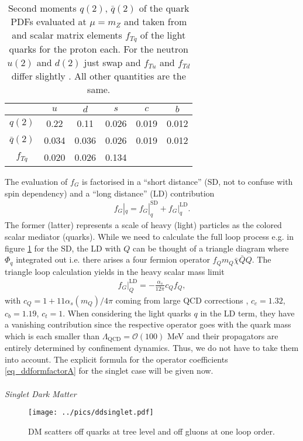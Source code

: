 \begin{table}[b]
 \begin{tabular}{c|ccccc}
   & $u$ & $d$ & $s$ & $c$ &$b$ \\
   \hline
  $q(2)$ & 0.22 & 0.11 & 0.026 & 0.019 & 0.012\\
  $\bar q(2)$ & 0.034 & 0.036 & 0.026 & 0.019 & 0.012\\
  $f_{Tq}$ & 0.020& 0.026 & 0.134 \cite{1209.3641}\\
 \end{tabular}
\caption{Second moments $q(2)$, $\bar q(2)$ of the quark PDFs evaluated at $\mu=m_Z$ and taken from \cite{0201195} and scalar matrix elements $f_{Tq}$ of 
the light quarks for the 
proton each. For the neutron $u(2)$ and $d(2)$ just swap and $f_{Tu}$ and $f_{Td}$ differ slightly \cite{9506380}. All other quantities are the same. }
\label{tab_parton}
\end{table}
\noindent The evaluation of $f_G$ is factorised in a ``short distance'' (SD, not to confuse with spin dependency) and a ``long distance'' (LD) 
contribution
\begin{align}
 f_G|_q = f_G|^\text{SD}_q + f_G|^\text{LD}_q. 
\end{align}
The former (latter) represents a scale of heavy (light) particles as the colored scalar mediator (quarks). While we need to calculate the full
loop process e.g. in figure \ref{pic_ddsinglet} for the SD, the LD with $Q$ can be thought of a triangle diagram where $\Phi_q$ integrated 
out i.e. there arises a four fermion operator $f_Q m_Q \bar \chi \bar Q Q$. The triangle loop calculation yields in the heavy scalar mass limit 
\begin{align}
 f_G|_Q^\text{LD} = -\frac{\alpha_s}{12\pi} c_Q f_Q,
 \label{eq_longdistance}
\end{align}
with $c_Q = 1+11\alpha_s(m_Q)/4\pi$ coming from large QCD corrections \cite{Djouadi}, $c_c=1.32$, $c_b = 1.19$, $c_t = 1$.
When considering the light quarks $q$ in the LD term, they have a vanishing contribution since the respective operator goes with the quark mass
which is each smaller than $\Lambda_\text{QCD} = \mathcal{O}(100)$ MeV and their propagators are entirely determined by confinement dynamics. Thus,
we do not have to take them into account. The explicit formula for the operator coefficients \eqref{eq_ddformfactorA} for the singlet case 
will be given now.
\\ \\ \textit{Singlet Dark Matter}\\
\begin{figure}[t]
 \texttt{[image: ../pics/ddsinglet.pdf]}
 \caption{DM scatters off quarks at tree level and off gluons at one loop order.}
 \label{pic_ddsinglet}
\end{figure}
